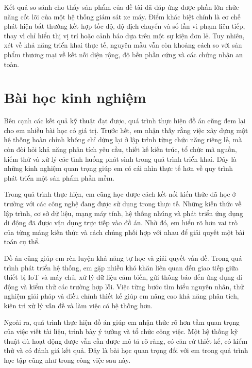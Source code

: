 \documentclass[../DoAn.tex]{subfiles}
\begin{document}
Kết quả so sánh cho thấy sản phẩm của đề tài đã đáp ứng được phần lớn chức
năng cốt lõi của một hệ thống giám sát xe máy. Điểm khác biệt chính là cơ chế
phát hiện bất thường kết hợp tốc độ, độ dịch chuyển và số lần vi phạm liên
tiếp, thay vì chỉ hiển thị vị trí hoặc cảnh báo dựa trên một sự kiện đơn lẻ.
Tuy nhiên, xét về khả năng triển khai thực tế, nguyên mẫu vẫn còn khoảng cách
so với sản phẩm thương mại về kết nối diện rộng, độ bền phần cứng và các
chứng nhận an toàn.

\section{Bài học kinh nghiệm }

Bên cạnh các kết quả kỹ thuật đạt được, quá trình thực hiện đồ án cũng đem lại cho em nhiều bài học có giá trị. Trước hết, em nhận thấy rằng việc xây dựng một hệ thống hoàn chỉnh không chỉ dừng lại ở lập trình từng chức năng riêng lẻ, mà còn đòi hỏi khả năng phân tích yêu cầu, thiết kế kiến trúc, tổ chức mã nguồn, kiểm thử và xử lý các tình huống phát sinh trong quá trình triển khai. Đây là những kinh nghiệm quan trọng giúp em có cái nhìn thực tế hơn về quy trình phát triển một sản phẩm phần mềm.

Trong quá trình thực hiện, em cũng học được cách kết nối kiến thức đã học ở trường với các công nghệ đang được sử dụng trong thực tế. Những kiến thức về lập trình, cơ sở dữ liệu, mạng máy tính, hệ thống nhúng và phát triển ứng dụng di động đã được vận dụng trực tiếp vào đồ án. Nhờ đó, em hiểu rõ hơn vai trò của từng mảng kiến thức và cách chúng phối hợp với nhau để giải quyết một bài toán cụ thể.

Đồ án cũng giúp em rèn luyện khả năng tự học và giải quyết vấn đề. Trong quá trình phát triển hệ thống, em gặp nhiều khó khăn liên quan đến giao tiếp giữa thiết bị IoT và máy chủ, xử lý dữ liệu cảm biến, gửi thông báo đến ứng dụng di động và kiểm thử các trường hợp lỗi. Việc từng bước tìm hiểu nguyên nhân, thử nghiệm giải pháp và điều chỉnh thiết kế giúp em nâng cao khả năng phân tích, kiên trì xử lý vấn đề và làm việc có hệ thống hơn.

Ngoài ra, quá trình thực hiện đồ án giúp em nhận thức rõ hơn tầm quan trọng của việc viết tài liệu, trình bày ý tưởng và tổ chức công việc. Một hệ thống kỹ thuật dù hoạt động được vẫn cần được mô tả rõ ràng, có căn cứ thiết kế, có kiểm thử và có đánh giá kết quả. Đây là bài học quan trọng đối với em trong quá trình học tập cũng như trong công việc sau này.
\end{document}
